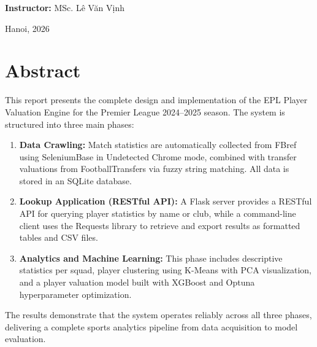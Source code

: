 \documentclass[a4paper,12pt]{report}
\begin{document}
\begin{titlepage}
\begin{center}
\vspace{0.8cm}

{\large\textbf{Instructor:} \foreignlanguage{vietnamese}{MSc. Lê Văn Vịnh}}

\vfill

{\large Hanoi, 2026}

\end{center}
\end{titlepage}

\chapter*{Abstract}

This report presents the complete design and implementation of the EPL Player Valuation Engine for the Premier League 2024--2025 season. The system is structured into three main phases:

\begin{enumerate}
    \item \textbf{Data Crawling:} Match statistics are automatically collected from FBref using SeleniumBase in Undetected Chrome mode, combined with transfer valuations from FootballTransfers via fuzzy string matching. All data is stored in an SQLite database.
    
    \item \textbf{Lookup Application (RESTful API):} A Flask server provides a RESTful API for querying player statistics by name or club, while a command-line client uses the Requests library to retrieve and export results as formatted tables and CSV files.
    
    \item \textbf{Analytics and Machine Learning:} This phase includes descriptive statistics per squad, player clustering using K-Means with PCA visualization, and a player valuation model built with XGBoost and Optuna hyperparameter optimization.
\end{enumerate}

The results demonstrate that the system operates reliably across all three phases, delivering a complete sports analytics pipeline from data acquisition to model evaluation.

\newpage
\tableofcontents
\end{document}
